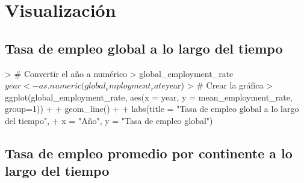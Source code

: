 \documentclass{article}
\begin{document}
\section{Visualización}

\subsection{Tasa de empleo global a lo largo del tiempo}

\begin{Schunk}
\begin{Sinput}
> # Convertir el año a numérico
> global_employment_rate$year <- as.numeric(global_employment_rate$year)
> # Crear la gráfica
> ggplot(global_employment_rate, aes(x = year, y = mean_employment_rate, group=1)) +
+   geom_line() +
+   labs(title = "Tasa de empleo global a lo largo del tiempo",
+        x = "Año", y = "Tasa de empleo global")
\end{Sinput}
\end{Schunk}

\subsection{Tasa de empleo promedio por continente a lo largo del tiempo}

\begin{Schunk}
\end{Schunk}
\end{document}
